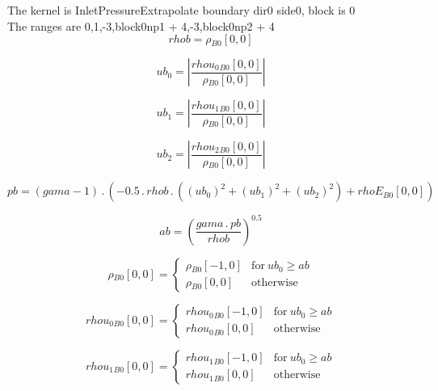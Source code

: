 \documentclass{article}
\begin{document}
\noindent The kernel is InletPressureExtrapolate boundary dir0 side0, block is 0\\\noindent The ranges are 0,1,-3,block0np1 + 4,-3,block0np2 + 4\\\begin{dmath}rhob = {\rho{_{B0}}}[{0,0}]\end{dmath}

\begin{dmath}ub_{0} = \left|{\frac{{rhou_{0}{_{B0}}}[{0,0}]}{{\rho{_{B0}}}[{0,0}]}}\right|\end{dmath}

\begin{dmath}ub_{1} = \left|{\frac{{rhou_{1}{_{B0}}}[{0,0}]}{{\rho{_{B0}}}[{0,0}]}}\right|\end{dmath}

\begin{dmath}ub_{2} = \left|{\frac{{rhou_{2}{_{B0}}}[{0,0}]}{{\rho{_{B0}}}[{0,0}]}}\right|\end{dmath}

\begin{dmath}pb = \left(gama - 1\right) \,.\, \left(- 0.5 \,.\, rhob \,.\, \left(\left(ub_{0} \right)^{2} + \left(ub_{1} \right)^{2} + \left(ub_{2} \right)^{2}\right) + {rhoE{_{B0}}}[{0,0}]\right)\end{dmath}

\begin{dmath}ab = \left(\frac{gama \,.\, pb}{rhob} \right)^{0.5}\end{dmath}

\begin{dmath}{\rho{_{B0}}}[{0,0}] = \begin{cases} {\rho{_{B0}}}[{-1,0}] & \text{for}\: ub_{0} \geq ab \\{\rho{_{B0}}}[{0,0}] & \text{otherwise} \end{cases}\end{dmath}

\begin{dmath}{rhou_{0}{_{B0}}}[{0,0}] = \begin{cases} {rhou_{0}{_{B0}}}[{-1,0}] & \text{for}\: ub_{0} \geq ab \\{rhou_{0}{_{B0}}}[{0,0}] & \text{otherwise} \end{cases}\end{dmath}

\begin{dmath}{rhou_{1}{_{B0}}}[{0,0}] = \begin{cases} {rhou_{1}{_{B0}}}[{-1,0}] & \text{for}\: ub_{0} \geq ab \\{rhou_{1}{_{B0}}}[{0,0}] & \text{otherwise} \end{cases}\end{dmath}
\end{document}
